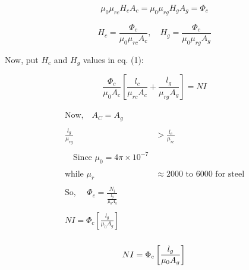 \documentclass{article}
\begin{document}
\begin{equation}
    \mu_0 \mu_{rc} H_c A_c = \mu_0 \mu_{rg} H_g A_g = \Phi_c \tag{3}
\end{equation}

\begin{equation*}
    H_c = \frac{\Phi_c}{\mu_0\mu_{rc} A_c}, \quad H_g = \frac{\Phi_c}{\mu_0\mu_{rg} A_g}
\end{equation*}

Now, put \( H_c \) and \( H_g \) values in eq. (1):

\begin{equation}
    \frac{\Phi_c}{\mu_0 A_c} \left[ \frac{l_c}{\mu_{rc} A_c} + \frac{l_g}{\mu_{rg} A_g} \right] = NI
\end{equation}

\begin{align*}
\begin{split}
    \text{Now,} \quad A_C = A_g \\[0.5cm]\\
    \frac{l_g}{\mu_{rg}} &> \frac{l_c}{\mu_{rc}}\\[0.5cm] \\
   \quad \text{Since } \mu_0 = 4\pi \times 10^{-7}\\[0.5cm] \\
    \text{while } \mu_r &\approx 2000 \text{ to } 6000 \text{ for steel}\\[0.5cm] \\
    \text{So, } \quad \Phi_c = \frac{N_i}{\frac{l_g}{\mu_0 A_g}}\\[0.5cm] \\
    NI = \Phi_c \left[ \frac{l_g}{\mu_0 A_g} \right] \\ 
\end{split}
\end{align*}

\begin{tcolorbox}[colframe=red, boxrule=1mm, sharp corners=south] %
\[
    NI = \Phi_c \left[ \frac{l_g}{\mu_0 A_g} \right] \\ 
\]
\end{tcolorbox}
\end{document}
